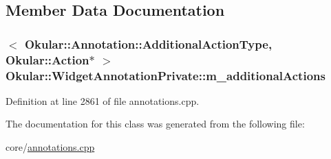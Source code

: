 \subsection{Member Data Documentation}
\hypertarget{classOkular_1_1WidgetAnnotationPrivate_ab2ee99f0d8e3f8196f8be7483ded3a2a}{
\subsubsection[{m\+\_\+additional\+Actions}]{$<$ {\bf Okular\+::\+Annotation\+::\+Additional\+Action\+Type}, {\bf Okular\+::\+Action}$\ast$ $>$ Okular\+::\+Widget\+Annotation\+Private\+::m\+\_\+additional\+Actions}}\label{classOkular_1_1WidgetAnnotationPrivate_ab2ee99f0d8e3f8196f8be7483ded3a2a}


Definition at line 2861 of file annotations.\+cpp.



The documentation for this class was generated from the following file\+:\begin{DoxyCompactItemize}
\item 
core/\hyperlink{annotations_8cpp}{annotations.\+cpp}\end{DoxyCompactItemize}
